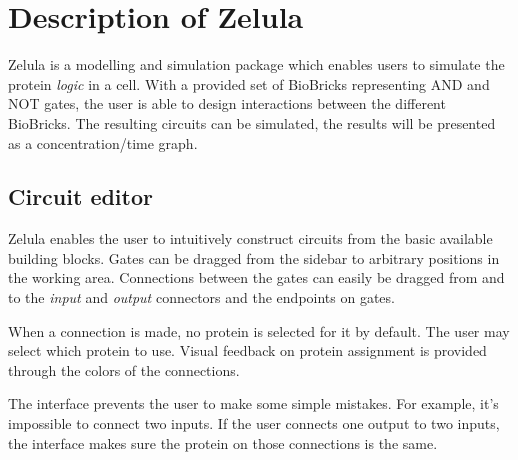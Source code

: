

\newcommand{\screenshotScale}{1.4}



\section{Description of Zelula}
Zelula is a modelling and simulation package which enables users to simulate the protein \textit{logic} in a cell. With a provided set of BioBricks representing AND and NOT gates, the user is able to design interactions between the different BioBricks. The resulting circuits can be simulated, the results will be presented as a concentration/time graph.


\subsection{Circuit editor}
\begin{figure}[h!]
\centering{}
\end{figure}

\noindent Zelula enables the user to intuitively construct circuits from the basic available building blocks. Gates can be dragged from the sidebar to arbitrary positions in the working area. Connections between the gates can easily be dragged from and to the \textit{input} and \textit{output} connectors and the endpoints on gates. 

When a connection is made, no protein is selected for it by default. The user may select which protein to use. Visual feedback on protein assignment is provided through the colors of the connections.

The interface prevents the user to make some simple mistakes. For example, it's impossible to connect two inputs. If the user connects one output to two inputs, the interface makes sure the protein on those connections is the same.

